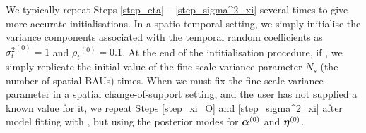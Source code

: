 \documentclass[nojss]{jss}
\def\mbf#1{{%
\mathchoice%
{\hbox{\boldmath$\displaystyle{#1}$}}%
{\hbox{\boldmath$\textstyle{#1}$}}%
{\hbox{\boldmath$\scriptstyle{#1}$}}%
{\hbox{\boldmath$\scriptscriptstyle{#1}$}}%
}}
\def\vec{\mbf}
\begin{document}
\begin{appendix}
\begin{enumerate}
\begin{enumerate}[i.]
    \end{enumerate}
\end{enumerate}
We typically repeat Steps \ref{step_eta} -- \ref{step_sigma^2_xi} several times to give more accurate initialisations. 
In a spatio-temporal setting, we simply initialise the variance components associated with the temporal random coefficients as ${\sigma^2_t}^{(0)} = 1$ and ${\rho_t}^{(0)} = 0.1$.
At the end of the intitialisation procedure, if , we simply replicate the initial value of the fine-scale variance parameter $N_s$ (the number of spatial BAUs) times. 
 When we must fix the fine-scale variance parameter in a spatial change-of-support setting, and the user has not supplied a known value for it, we repeat 
 Steps \ref{step_xi_O} and \ref{step_sigma^2_xi} after model fitting with , but using the posterior modes for $\vec{\alpha}^{(0)}$ and $\vec{\eta}^{(0)}$. 



\end{appendix}
\end{document}
